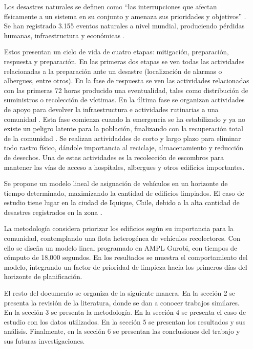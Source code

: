 \documentclass[letterpaper,conference]{IEEEtran}
\begin{document}
Los desastres naturales se definen como “las interrupciones que afectan físicamente a un sistema en su conjunto y amenaza sus prioridades y objetivos” \citep{van2006humanitarian}. Se han registrado 3.155 eventos naturales a nivel mundial, produciendo pérdidas humanas, infraestructura y económicas \citep{emdat}.

Estos presentan un ciclo de vida de cuatro etapas: mitigación, preparación, respuesta y preparación. En las primeras dos etapas se ven todas las actividades relacionadas a la preparación ante un desastre (localización de alarmas o albergues, entre otros). En la fase de respuesta se ven las actividades relacionadas con las primeras 72 horas producido una eventualidad, tales como distribución de suministros o recolección de víctimas. En la última fase se organizan actividades de apoyo para devolver la infraestructura e actividades rutinarias a una comunidad \citep{Feng2003}. Esta fase comienza cuando la emergencia se ha estabilizado y ya no existe un peligro latente para la población, finalizando con la recuperación total de la comunidad \citep{lindell2006wiley}. Se realizan actividaddes de corto y largo plazo para eliminar todo rastro físico, dándole importancia al reciclaje, almacenamiento y reducción de desechos. Una de estas actividades es la recolección de escombros para mantener las vías de acceso a hospitales, albergues y otros edificios importantes.

Se propone un modelo lineal de asignación de vehículos en un horizonte de tiempo determinado, maximizando la cantidad de edificios limpiados. El caso de estudio tiene lugar en la ciudad de Iquique, Chile, debido a la alta cantidad de desastres registrados en la zona \citep{sismologia}.

La metodología considera priorizar los edificios según su importancia para la comunidad, contemplando una flota heterogénea de vehículos recolectores. Con ello se diseña un modelo lineal programado en AMPL Gurobi, con tiempos de cómputo de 18,000 segundos. En los resultados se muestra el comportamiento del modelo, integrando un factor de prioridad de limpieza hacia los primeros días del horizonte de planificación.


El resto del documento se organiza de la siguiente manera. En la sección 2 se presenta la revisión de la literatura, donde se dan a conocer trabajos similares. En la sección 3 se presenta la metodología. En la sección 4 se presenta el caso de estudio con los datos utilizados. En la sección 5 se presentan los resultados y sus análisis. Finalmente, en la sección 6 se presentan las conclusiones del trabajo y sus futuras investigaciones.
\end{document}
